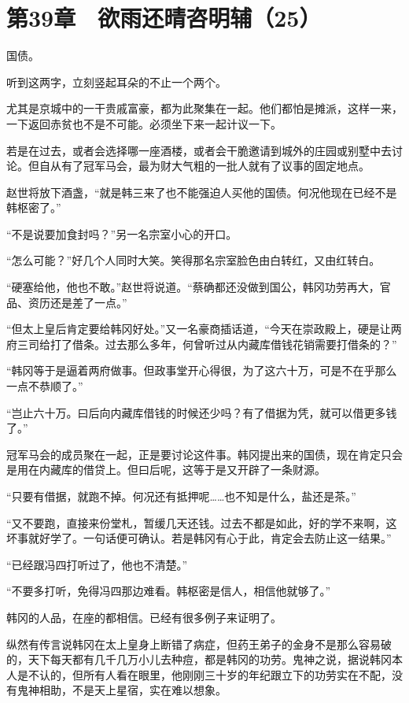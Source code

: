 \section{第39章　欲雨还晴咨明辅（25）}

国债。

听到这两字，立刻竖起耳朵的不止一个两个。

尤其是京城中的一干贵戚富豪，都为此聚集在一起。他们都怕是摊派，这样一来，一下返回赤贫也不是不可能。必须坐下来一起计议一下。

若是在过去，或者会选择哪一座酒楼，或者会干脆邀请到城外的庄园或别墅中去讨论。但自从有了冠军马会，最为财大气粗的一批人就有了议事的固定地点。

赵世将放下酒盏，“就是韩三来了也不能强迫人买他的国债。何况他现在已经不是韩枢密了。”

“不是说要加食封吗？”另一名宗室小心的开口。

“怎么可能？”好几个人同时大笑。笑得那名宗室脸色由白转红，又由红转白。

“硬塞给他，他也不敢。”赵世将说道。“蔡确都还没做到国公，韩冈功劳再大，官品、资历还是差了一点。”

“但太上皇后肯定要给韩冈好处。”又一名豪商插话道，“今天在崇政殿上，硬是让两府三司给打了借条。过去那么多年，何曾听过从内藏库借钱花销需要打借条的？”

“韩冈等于是逼着两府做事。但政事堂开心得很，为了这六十万，可是不在乎那么一点不恭顺了。”

“岂止六十万。曰后向内藏库借钱的时候还少吗？有了借据为凭，就可以借更多钱了。”

冠军马会的成员聚在一起，正是要讨论这件事。韩冈提出来的国债，现在肯定只会是用在内藏库的借贷上。但曰后呢，这等于是又开辟了一条财源。

“只要有借据，就跑不掉。何况还有抵押呢……也不知是什么，盐还是茶。”

“又不要跑，直接来份堂札，暂缓几天还钱。过去不都是如此，好的学不来啊，这坏事就好学了。一句话便可确认。若是韩冈有心于此，肯定会去防止这一结果。”

“已经跟冯四打听过了，他也不清楚。”

“不要多打听，免得冯四那边难看。韩枢密是信人，相信他就够了。”

韩冈的人品，在座的都相信。已经有很多例子来证明了。

纵然有传言说韩冈在太上皇身上断错了病症，但药王弟子的金身不是那么容易破的，天下每天都有几千几万小儿去种痘，都是韩冈的功劳。鬼神之说，据说韩冈本人是不认的，但所有人看在眼里，他刚刚三十岁的年纪跟立下的功劳实在不配，没有鬼神相助，不是天上星宿，实在难以想象。

